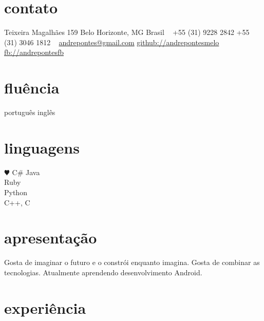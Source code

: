 \documentclass[]{friggeri-cv}
\begin{document}


\begin{aside} %
\section{contato}
Teixeira Magalhães 159
Belo Horizonte, MG
Brasil
~
+55 (31) 9228 2842
+55 (31) 3046 1812
~
\href{mailto:andrepontes@gmail.com}{andrepontes@gmail.com}
\href{https://github.com/andrepontesmelo}{github://andrepontesmelo}
\href{http://facebook.com/andrepontesfb}{fb://andrepontesfb}
\section{fluência}
português
inglês 
\section{linguagens}
{\color{red} $\varheartsuit$} C\#
Java\\Ruby\\Python\\C++, C
\end{aside}

\section{apresentação}
Gosta de imaginar o futuro e o constrói enquanto imagina. Gosta de combinar as tecnologias. 
Atualmente aprendendo desenvolvimento Android.

\section{experiência}
\end{document}
